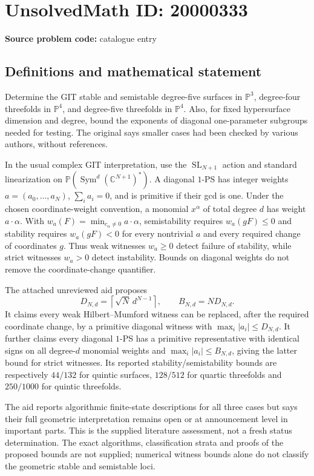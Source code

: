 \documentclass[11pt]{article}
\newcommand{\C}{\mathbb{C}}
\newcommand{\PP}{\mathbb{P}}
\begin{document}
\section*{UnsolvedMath ID: 20000333}
\textbf{Source problem code:} catalogue entry
\subsection{Definitions and mathematical statement}
Determine the GIT stable and semistable degree-five surfaces in $\PP^3$, degree-four threefolds in $\PP^4$, and degree-five threefolds in $\PP^4$. Also, for fixed hypersurface dimension and degree, bound the exponents of diagonal one-parameter subgroups needed for testing. The original says smaller cases had been checked by various authors, without references.

In the usual complex GIT interpretation, use the $\operatorname{SL}_{N+1}$ action and standard linearization on $\PP(\operatorname{Sym}^d(\C^{N+1})^*)$. A diagonal $1$-PS has integer weights $a=(a_0,\ldots,a_N)$, $\sum_i a_i=0$, and is primitive if their gcd is one. Under the chosen coordinate-weight convention, a monomial $x^\alpha$ of total degree $d$ has weight $a\cdot\alpha$. With $w_a(F)=\min_{c_\alpha\ne0}a\cdot\alpha$, semistability requires $w_a(gF)\le0$ and stability requires $w_a(gF)<0$ for every nontrivial $a$ and every required change of coordinates $g$. Thus weak witnesses $w_a\ge0$ detect failure of stability, while strict witnesses $w_a>0$ detect instability. Bounds on diagonal weights do not remove the coordinate-change quantifier.

The attached unreviewed aid proposes
\[
D_{N,d}=\left\lceil\sqrt N\,d^{N-1}\right\rceil,\qquad
B_{N,d}=N D_{N,d}.
\]
It claims every weak Hilbert--Mumford witness can be replaced, after the required coordinate change, by a primitive diagonal witness with $\max_i|a_i|\le D_{N,d}$. It further claims every diagonal $1$-PS has a primitive representative with identical signs on all degree-$d$ monomial weights and $\max_i|a_i|\le B_{N,d}$, giving the latter bound for strict witnesses. Its reported stability/semistability bounds are respectively $44/132$ for quintic surfaces, $128/512$ for quartic threefolds and $250/1000$ for quintic threefolds.

The aid reports algorithmic finite-state descriptions for all three cases but says their full geometric interpretation remains open or at announcement level in important parts. This is the supplied literature assessment, not a fresh status determination. The exact algorithms, classification strata and proofs of the proposed bounds are not supplied; numerical witness bounds alone do not classify the geometric stable and semistable loci.
\end{document}
